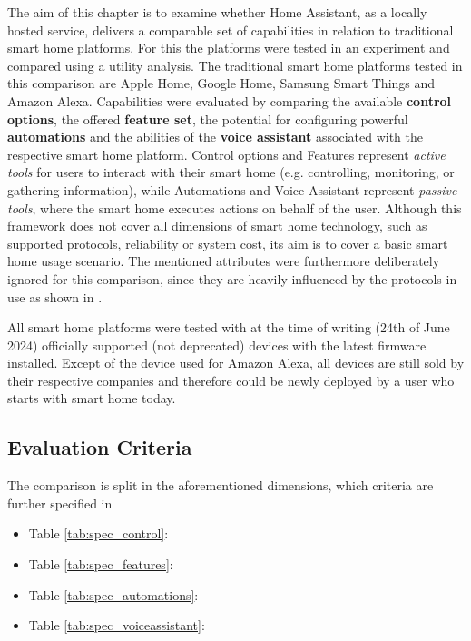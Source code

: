 The aim of this chapter is to examine whether Home Assistant, as a locally hosted service, delivers a comparable set of capabilities in relation to traditional smart home platforms. For this the platforms were tested in an experiment and compared using a utility analysis.
The traditional smart home platforms tested in this comparison are Apple Home, Google Home, Samsung Smart Things and Amazon Alexa. Capabilities were evaluated by comparing the available \textbf{control options}, the offered \textbf{feature set}, the potential for configuring powerful \textbf{automations} and the abilities of the \textbf{voice assistant }associated with the respective smart home platform.
Control options and Features represent \textit{active tools} for users to interact with their smart home (e.g. controlling, monitoring, or gathering information), while Automations and Voice Assistant represent \textit{passive tools}, where the smart home executes actions on behalf of the user.
Although this framework does not cover all dimensions of smart home technology, such as supported protocols, reliability or system cost, its aim is to cover a basic smart home usage scenario. The mentioned attributes were furthermore deliberately ignored for this comparison, since they are heavily influenced by the protocols in use as shown in \cite{SHS-Overview&ComparativeAnalysis-8718722}.

All smart home platforms were tested with at the time of writing (24th of June 2024) officially supported (not deprecated) devices with the latest firmware installed. Except of the device used for Amazon Alexa, all devices are still sold by their respective companies and therefore could be newly deployed by a user who starts with smart home today.

\subsection{Evaluation Criteria}

The comparison is split in the aforementioned dimensions, which criteria are further specified in

\begin{itemize}
    \item Table \ref{tab:spec_control}: 
    \item Table \ref{tab:spec_features}: 
    \item Table \ref{tab:spec_automations}: 
    \item Table \ref{tab:spec_voiceassistant}: 
\end{itemize}

